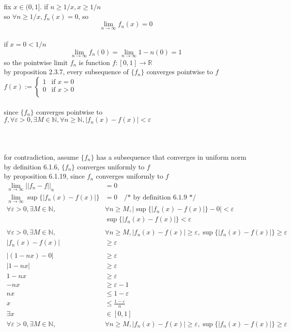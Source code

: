 \documentclass[12pt, border = 4pt, multi]{article} %
\begin{document}
fix $x \in (0, 1]$. if $n \geq 1 / x, x \geq 1 / n$\\
so $\forall n \geq 1 / x, f_n(x) = 0$, so
\[\lim_{n \rightarrow \infty} f_n(x) = 0\]
\\
if $x = 0 < 1 / n$
\[\lim_{n \rightarrow \infty} f_n(0) = \lim_{n \rightarrow \infty} 1 - n(0) = 1\]
so the pointwise limit $f_n$ is function $f: [0, 1] \rightarrow \mathbb{R}$\\
by proposition 2.3.7, every subsequence of $\{f_n\}$ converges pointwise to $f$\\
$f(x) :=
\begin{cases}
1 & \text{if } x = 0\\
0 & \text{if } x > 0\\
\end{cases}$
\\
\\
since $\{f_n\}$ converges pointwise to $f, \forall \varepsilon > 0, \exists M \in \mathbb{N}, \forall n \geq \mathbb{N}, |f_n(x) - f(x)| < \varepsilon$\\
\\
\\
\\
for contradiction, assume $\{f_n\}$ has a subsequence that converges in uniform norm\\
by definition 6.1.6, $\{f_n\}$ converges uniformly to $f$\\
by proposition 6.1.19, since $f_n$ converges uniformly to $f$
\begin{align*}
\lim_{n \rightarrow \infty} ||f_n - f||_u &= 0\\
\lim_{n \rightarrow \infty} \sup\{|f_n(x) - f(x)|\} &= 0 \quad\text{/* by definition 6.1.9 */}\\
\forall \varepsilon > 0, \exists M \in \mathbb{N}, &\forall n \geq M, |\sup\{|f_n(x) - f(x)|\} - 0| < \varepsilon\\
&\sup\{|f_n(x) - f(x)|\} < \varepsilon\\
\\
\forall \varepsilon > 0, \exists M \in \mathbb{N}, &\forall n \geq M, |f_n(x) - f(x)| \geq \varepsilon, \sup\{|f_n(x) - f(x)|\} \geq \varepsilon\\
|f_n(x) - f(x)| &\geq \varepsilon\\
\\
|(1 - nx) - 0| &\geq \varepsilon\\
|1 - nx| &\geq \varepsilon\\
1 - nx &\geq \varepsilon\\
-nx &\geq \varepsilon - 1\\
nx &\leq 1 - \varepsilon\\
x &\leq \frac{1 - \varepsilon}{n}\\
\exists x &\in [0, 1]\\
\forall \varepsilon > 0, \exists M \in \mathbb{N}, &\forall n \geq M, |f_n(x) - f(x)| \geq \varepsilon, \sup\{|f_n(x) - f(x)|\} \geq \varepsilon
\end{align*}
\end{document}
